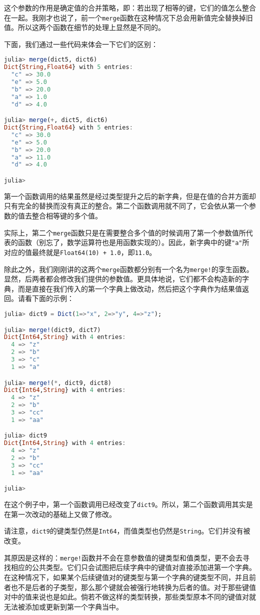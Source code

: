 这个参数的作用是确定值的合并策略，即：若出现了相等的键，它们的值怎么整合在一起。我刚才也说了，前一个\verb`merge`函数在这种情况下总会用新值完全替换掉旧值。所以这两个函数在细节的处理上显然是不同的。

下面，我们通过一些代码来体会一下它们的区别：
\begin{lstlisting}[language=julia]
julia> merge(dict5, dict6)
Dict{String,Float64} with 5 entries:
  "c" => 30.0
  "e" => 5.0
  "b" => 20.0
  "a" => 1.0
  "d" => 4.0

julia> merge(+, dict5, dict6)
Dict{String,Float64} with 5 entries:
  "c" => 30.0
  "e" => 5.0
  "b" => 20.0
  "a" => 11.0
  "d" => 4.0

julia> 
\end{lstlisting}

第一个函数调用的结果虽然是经过类型提升之后的新字典，但是在值的合并方面却只有完全的替换而没有真正的整合。第二个函数调用就不同了，它会依从第一个参数的值去整合相等键的多个值。

实际上，第二个\verb`merge`函数只是在需要整合多个值的时候调用了第一个参数值所代表的函数（别忘了，数学运算符也是用函数实现的）。因此，新字典中的键\verb`"a"`所对应的值最终就是\verb`Float64(10) + 1.0`，即\verb`11.0`。

除此之外，我们刚刚讲的这两个\verb`merge`函数都分别有一个名为\verb`merge!`的孪生函数。显然，后两者都会修改我们提供的参数值。更具体地说，它们都不会构造新的字典，而是直接在我们传入的第一个字典上做改动，然后把这个字典作为结果值返回。请看下面的示例：
\begin{lstlisting}[language=julia]
julia> dict9 = Dict(1=>"x", 2=>"y", 4=>"z");

julia> merge!(dict9, dict7)
Dict{Int64,String} with 4 entries:
  4 => "z"
  2 => "b"
  3 => "c"
  1 => "a"

julia> merge!(*, dict9, dict8)
Dict{Int64,String} with 4 entries:
  4 => "z"
  2 => "b"
  3 => "cc"
  1 => "aa"

julia> dict9
Dict{Int64,String} with 4 entries:
  4 => "z"
  2 => "b"
  3 => "cc"
  1 => "aa"

julia> 
\end{lstlisting}

在这个例子中，第一个函数调用已经改变了\verb`dict9`。所以，第二个函数调用其实是在第一次改动的基础上又做了修改。

请注意，\verb`dict9`的键类型仍然是\verb`Int64`，而值类型也仍然是\verb`String`。它们并没有被改变。

其原因是这样的：\verb`merge!`函数并不会在意参数值的键类型和值类型，更不会去寻找相应的公共类型。它们只会试图把后续字典中的键值对直接添加进第一个字典。在这种情况下，如果某个后续键值对的键类型与第一个字典的键类型不同，并且前者也不是后者的子类型，那么那个键就会被强行地转换为后者的值。对于那些键值对中的值来说也是如此。倘若不做这样的类型转换，那些类型原本不同的键值对就无法被添加或更新到第一个字典当中。

